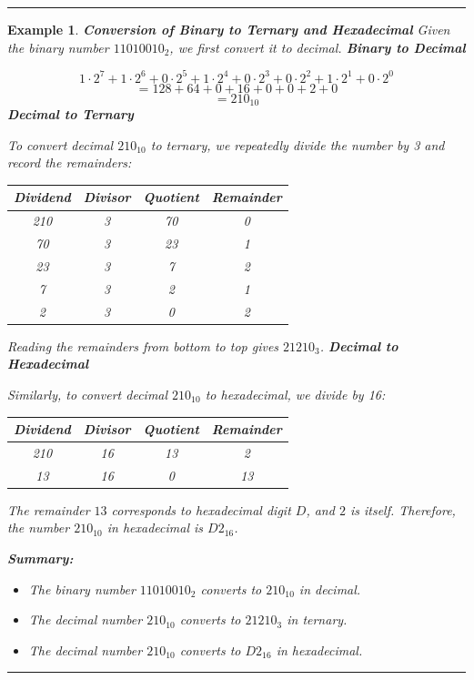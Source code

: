\documentclass[12pt]{article}
\newtheorem{example}{Example}
\newenvironment{examp}
{\vspace{0.5cm}
\hrule
\begin{example}}
{\hrule
\vspace{0.5cm}
\end{example}}
\begin{document}
\begin{examp}
	\textbf{Conversion of Binary to Ternary and Hexadecimal}\newline
	Given the binary number \( 11010010_2 \), we first convert it to decimal.
	\newline
	\textbf{Binary to Decimal}

	\[
		1 \cdot 2^7 + 1 \cdot 2^6 + 0 \cdot 2^5 + 1 \cdot 2^4 + 0 \cdot 2^3 + 0 \cdot 2^2 + 1 \cdot 2^1 + 0 \cdot 2^0 \]
	\[= 128 + 64 + 0 + 16 + 0 + 0 + 2 + 0\]
	\[= 210_{10}\]
	\newline
	\textbf{Decimal to Ternary}

	To convert decimal \(210_{10}\) to ternary, we repeatedly divide the number by 3 and record the remainders:

	\begin{center}
		\begin{tabular}{cccc}
			Dividend & Divisor & Quotient & Remainder \\
			\hline
			210      & 3       & 70       & 0         \\
			70       & 3       & 23       & 1         \\
			23       & 3       & 7        & 2         \\
			7        & 3       & 2        & 1         \\
			2        & 3       & 0        & 2         \\
		\end{tabular}
	\end{center}

	Reading the remainders from bottom to top gives \(21210_3\).
	\vspace{3mm}
	\newline
	\textbf{Decimal to Hexadecimal}

	Similarly, to convert decimal \(210_{10}\) to hexadecimal, we divide by 16:
	\begin{center}
		\begin{tabular}{cccc}
			Dividend & Divisor & Quotient & Remainder \\
			\hline
			210      & 16      & 13       & 2         \\
			13       & 16      & 0        & 13        \\
		\end{tabular}
	\end{center}

	The remainder \(13\) corresponds to hexadecimal digit \(D\), and \(2\) is itself. Therefore, the number \(210_{10}\) in hexadecimal is \(D2_{16}\).

	\textbf{Summary:}
	\begin{itemize}
		\item The binary number \(11010010_2\) converts to \(210_{10}\) in decimal.
		\item The decimal number \(210_{10}\) converts to \(21210_3\) in ternary.
		\item The decimal number \(210_{10}\) converts to \(D2_{16}\) in hexadecimal.
	\end{itemize}
\end{examp}
\end{document}
